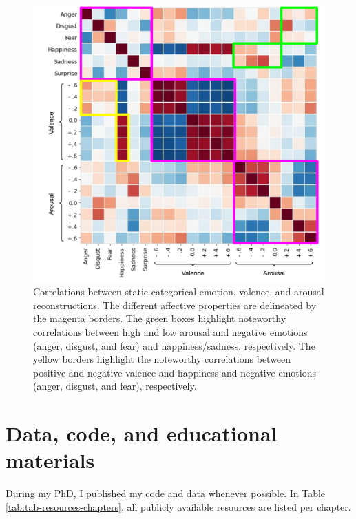 \documentclass[12pt,american,a4paper,oneside,]{memoir} %
\begin{document}
\begin{figure}
\centering
\includegraphics{_bookdown_files/static-vs-dynamic-files/figures/figure_S9.pdf}
\caption{\label{fig:fig-svsd-S9}Correlations between static categorical emotion, valence, and arousal reconstructions. The different affective properties are delineated by the magenta borders. The green boxes highlight noteworthy correlations between high and low arousal and negative emotions (anger, disgust, and fear) and happiness/sadness, respectively. The yellow borders highlight the noteworthy correlations between positive and negative valence and happiness and negative emotions (anger, disgust, and fear), respectively.}
\end{figure}



\hypertarget{resources-supplement}{%
\chapter{Data, code, and educational materials}\label{resources-supplement}}

During my PhD, I published my code and data whenever possible. In Table \ref{tab:tab-resources-chapters}, all publicly available resources are listed per chapter.

\begingroup\fontsize{8}{10}\selectfont
\end{document}
